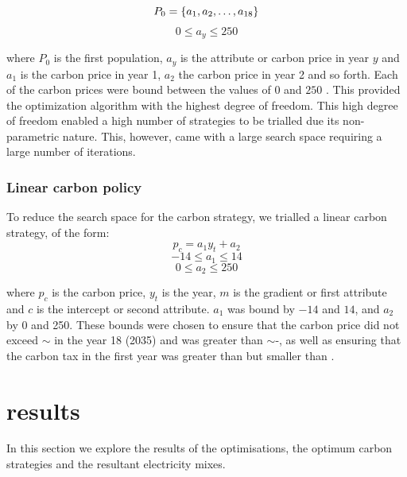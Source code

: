 \documentclass[sigconf]{acmart}
\begin{document}
\begin{equation}
\label{eq:eighteen_degrees_freedom}
	P_0=\{a_1,a_2,\ldots,a_{18}\}\\
\end{equation} 
\begin{equation*}
		 0\leq a_y\leq 250
\end{equation*}

\noindent where $P_0$ is the first population, $a_y$ is the attribute or carbon price in year $y$ and $a_1$ is the carbon price in year 1, $a_2$ the carbon price in year 2 and so forth. Each of the carbon prices were bound between the values of \textsterling$0$ and  \textsterling$250$ . This provided the optimization algorithm with the highest degree of freedom. This high degree of freedom enabled a high number of strategies to be trialled due its non-parametric nature. This, however, came with a large search space requiring a large number of iterations.


 \subsubsection{Linear carbon policy}
 \label{sssec:linear_carbon_strategy}
 To reduce the search space for the carbon strategy, we trialled a linear carbon strategy, of the form:
 \begin{equation}
 	p_c=a_1y_t+a_2
 \end{equation}
 \begin{equation*}
 	-14 \leq a_1\leq 14
 \end{equation*}
  \begin{equation*}
 	0 \leq a_2\leq 250
 \end{equation*}
 
 \noindent where $p_c$ is the carbon price, $y_t$ is the year, $m$ is the gradient or first attribute and $c$ is the intercept or second attribute. $a_1$ was bound by $-14$ and $14$, and $a_2$ by 0 and 250. These bounds were chosen to ensure that the carbon price did not exceed ${\sim}$ in the year 18 (2035) and was greater than ${\sim}$-, as well as ensuring that the carbon tax in the first year was greater than  but smaller than .

\section{results}
\label{sec:results}

In this section we explore the results of the optimisations, the optimum carbon strategies and the resultant electricity mixes.
\end{document}
